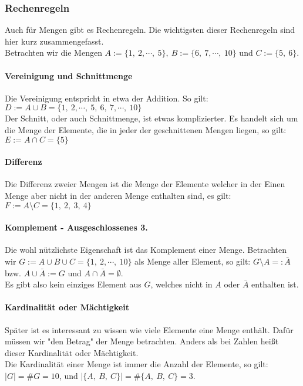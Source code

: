 \subsubsection{Rechenregeln}$ $\\
Auch für Mengen gibt es Rechenregeln. Die wichtigsten dieser Rechenregeln sind hier kurz zusammengefasst.\\
Betrachten wir die Mengen $A:=\{1,\ 2,\cdots,\ 5\},\ B:=\{6,\ 7,\cdots,\ 10\}$ und $C:=\{5,\ 6\}$.
\paragraph{Vereinigung und Schnittmenge}$ $\\
Die Vereinigung entspricht in etwa der Addition. So gilt: $D:=A\cup B=\{1,\ 2,\cdots,\ 5,\ 6,\ 7,\cdots,\ 10\}$\\
Der Schnitt, oder auch Schnittmenge, ist etwas komplizierter. Es handelt sich um die Menge der Elemente, die in jeder der geschnittenen Mengen liegen, so gilt: $E:=A\cap C=\{5\}$\\
\paragraph{Differenz}$ $\\
Die Differenz zweier Mengen ist die Menge der Elemente welcher in der Einen Menge aber nicht in der anderen Menge enthalten sind, es gilt: $F:=A\setminus C=\{1,\ 2,\ 3,\ 4\}$\\
\paragraph{Komplement - Ausgeschlossenes 3.}$ $\\
Die wohl nützlichste Eigenschaft ist das Komplement einer Menge. Betrachten wir $G:=A\cup B\cup C=\{1,\ 2,\cdots,\ 10\}$ als Menge aller Element, so gilt: $G\setminus A=:\bar{A}$ bzw. $A\cup\bar{A}:=G$ und $A\cap\bar{A}=\emptyset$.\\
Es gibt also kein einziges Element aus $G$, welches nicht in $A$ oder $\bar{A}$ enthalten ist.\\ 

\paragraph{Kardinalität oder Mächtigkeit}$ $\\
Später ist es interessant zu wissen wie viele Elemente eine Menge enthält. Dafür müssen wir "den Betrag"  der Menge betrachten. Anders als bei Zahlen heißt dieser Kardinalität oder Mächtigkeit.\\
Die Kardinalität einer Menge ist immer die Anzahl der Elemente, so gilt: $\vert G\vert=\# G=10$, und $\vert\{A,\ B,\ C\}\vert=\# \{A,\ B,\ C\}=3$.\\
